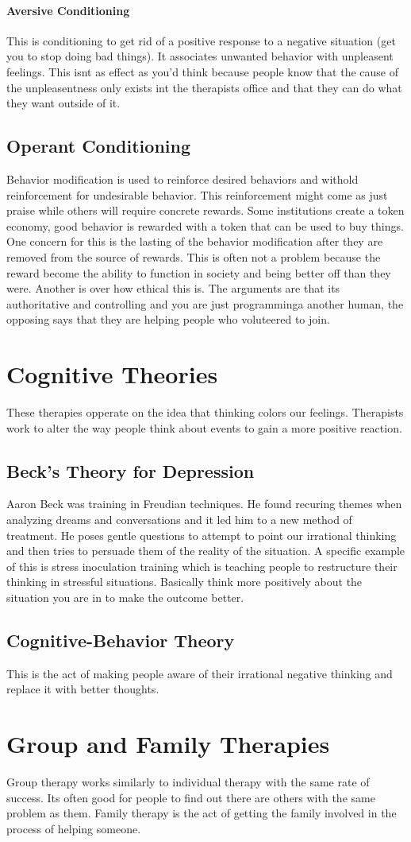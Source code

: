 \documentclass[12pt]{article}
\begin{document}
\paragraph*{Aversive Conditioning}
This is conditioning to get rid of a positive response to a negative situation (get you to stop doing bad things). It associates unwanted behavior with unpleasent feelings. This isnt as effect as you'd think because people know that the cause of the unpleasentness only exists int the therapists office and that they can do what they want outside of it.
\subsection*{Operant Conditioning}
Behavior modification is used to reinforce desired behaviors and withold reinforcement for undesirable behavior. This reinforcement might come as just praise while others will require concrete rewards. Some institutions create a token economy, good behavior is rewarded with a token that can be used to buy things. One concern for this is the lasting of the behavior modification after they are removed from the source of rewards. This is often not a problem because the reward become the ability to function in society and being better off than they were. Another is over how ethical this is. The arguments are that its authoritative and controlling and you are just programminga another human, the opposing says that they are helping people who voluteered to join.
\section*{Cognitive Theories}
These therapies opperate on the idea that thinking colors our feelings. Therapists work to alter the way people think about events to gain a more positive reaction.
\subsection*{Beck's Theory for Depression}
Aaron Beck was training in Freudian techniques. He found recuring themes when analyzing dreams and conversations and it led him to a new method of treatment. He poses gentle questions to attempt to point our irrational thinking and then tries to persuade them of the reality of the situation. A specific example of this is stress inoculation training which is teaching people to restructure their thinking in stressful situations. Basically think more positively about the situation you are in to make the outcome better.
\subsection*{Cognitive-Behavior Theory}
This is the act of making people aware of their irrational negative thinking and replace it with better thoughts.
\section*{Group and Family Therapies}
Group therapy works similarly to individual therapy with the same rate of success. Its often good for people to find out there are others with the same problem as them. Family therapy is the act of getting the family involved in the process of helping someone.
\end{document}
